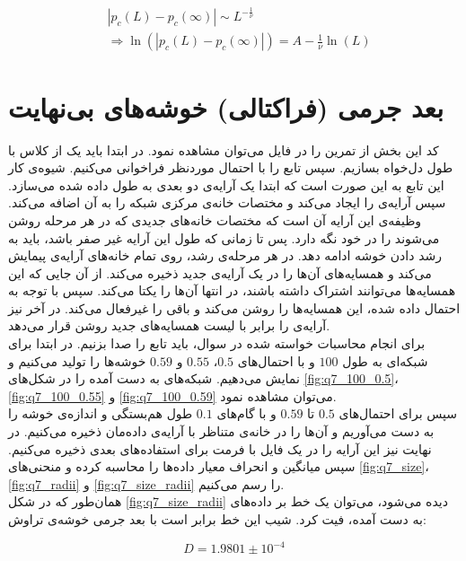 \documentclass[11pt, a4paper]{article}
\begin{document}
\begin{align}
  & |p_c(L) - p_c(\infty)| \sim L^{-\frac{1}{\nu}} \nonumber \\
  & \Rightarrow \ln(|p_c(L) - p_c(\infty)|) = A - \frac{1}{\nu} \ln(L)
  \label{eqn:q_6_p_l}
\end{align}


\section{\textbf{بعد جرمی (فراکتالی) خوشه‌های بی‌نهایت}}
کد این بخش از تمرین را در فایل
می‌توان مشاهده نمود.
در ابتدا باید یک
از کلاس
با طول دل‌خواه بسازیم.
سپس تابع
را با احتمال موردنظر فراخوانی می‌کنیم.
شیوه‌ی کار این تابع به این صورت است که ابتدا یک آرایه‌ی دو بعدی به طول داده شده می‌سازد.
سپس آرایه‌ی
را ایجاد می‌کند و مختصات خانه‌ی مرکزی شبکه را به آن اضافه می‌کند.
وظیفه‌ی این آرایه آن است که مختصات خانه‌های جدیدی که در هر مرحله روشن می‌شوند را در خود نگه دارد.
پس تا زمانی که طول این آرایه غیر صفر باشد، باید به رشد دادن خوشه ادامه دهد.
در هر مرحله‌ی رشد، روی تمام خانه‌های آرایه‌ی
پیمایش می‌کند و همسایه‌های آن‌ها را در یک آرایه‌ی جدید ذخیره می‌کند.
از آن جایی که این همسایه‌ها می‌توانند اشتراک داشته باشند، در انتها آن‌ها را یکتا می‌کند.
سپس با توجه به احتمال داده شده، این همسایه‌ها را روشن می‌کند و باقی را غیرفعال می‌کند.
در آخر نیز آرایه‌ی
را برابر با لیست همسایه‌های جدید روشن قرار می‌دهد.
\\
برای انجام محاسبات خواسته شده در سوال، باید تابع
را صدا بزنیم.
در ابتدا برای شبکه‌ای به طول
$100$
و با احتمال‌های
$0.5$،
$0.55$
و
$0.59$
خوشه‌‌ها را تولید می‌کنیم و نمایش می‌دهیم.
شبکه‌های به دست آمده را در شکل‌های
\ref{fig:q7_100_0.5}،
\ref{fig:q7_100_0.55}
و
\ref{fig:q7_100_0.59}
می‌توان مشاهده نمود.
\\
سپس برای احتمال‌های
$0.5$
تا
$0.59$
و با گام‌های
$0.1$
طول هم‌بستگی و اندازه‌ی خوشه را به دست می‌آوریم و آن‌ها را در خانه‌ی متناظر با آرایه‌ی داده‌مان ذخیره می‌کنیم.
در نهایت نیز این آرایه را در یک فایل با فرمت
برای استفاده‌های بعدی ذخیره می‌کنیم.
سپس میانگین و انحراف معیار داده‌ها را محاسبه کرده و منحنی‌های
\ref{fig:q7_size}،
\ref{fig:q7_radii}
و
\ref{fig:q7_size_radii}
را رسم می‌کنیم.
\\
همان‌طور که در شکل
\ref{fig:q7_size_radii}
دیده می‌شود، می‌توان یک خط بر داده‌های به دست آمده، فیت کرد.
شیب این خط برابر است با بعد جرمی خوشه‌ی تراوش:

\begin{equation}
  D = 1.9801 \pm 10^{-4}
\end{equation}
\end{document}
